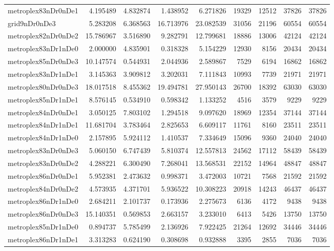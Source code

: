 \begin{longtable}{|l|r|r|r|r|r|r|r|r|}
metroplex83nDr0nDe1 & 4.195489 & 4.832874 & 1.438952 & 6.271826 & 19329 & 12512 & 37826 & 37826 \\
grid9nDr0nDe3 & 5.283208 & 6.368563 & 16.713976 & 23.082539 & 31056 & 21196 & 60554 & 60554 \\
metroplex82nDr0nDe2 & 15.786967 & 3.516890 & 9.282791 & 12.799681 & 18886 & 13006 & 42124 & 42124 \\
metroplex83nDr1nDe0 & 2.000000 & 4.835901 & 0.318328 & 5.154229 & 12930 & 8156 & 20434 & 20434 \\
metroplex85nDr0nDe3 & 10.147574 & 0.544931 & 2.044936 & 2.589867 & 7529 & 6194 & 16862 & 16862 \\
metroplex83nDr1nDe1 & 3.145363 & 3.909812 & 3.202031 & 7.111843 & 10993 & 7739 & 21971 & 21971 \\
metroplex80nDr0nDe3 & 18.017518 & 8.455362 & 19.494781 & 27.950143 & 26700 & 18392 & 63030 & 63030 \\
metroplex85nDr1nDe1 & 8.576145 & 0.534910 & 0.598342 & 1.133252 & 4516 & 3579 & 9229 & 9229 \\
metroplex84nDr0nDe1 & 3.050125 & 7.803102 & 1.294518 & 9.097620 & 18969 & 12354 & 37144 & 37144 \\
metroplex84nDr1nDe1 & 11.681704 & 3.783464 & 2.825653 & 6.609117 & 11761 & 8160 & 23511 & 23511 \\
metroplex84nDr1nDe0 & 2.157895 & 5.924112 & 1.410537 & 7.334649 & 15096 & 9360 & 24040 & 24040 \\
metroplex83nDr0nDe3 & 5.060150 & 6.747439 & 5.810374 & 12.557813 & 24562 & 17112 & 58439 & 58439 \\
metroplex83nDr0nDe2 & 4.288221 & 6.300490 & 7.268041 & 13.568531 & 22152 & 14964 & 48847 & 48847 \\
metroplex86nDr0nDe1 & 5.952381 & 2.473632 & 0.998371 & 3.472003 & 10721 & 7568 & 21592 & 21592 \\
metroplex84nDr0nDe2 & 4.573935 & 4.371701 & 5.936522 & 10.308223 & 20918 & 14243 & 46437 & 46437 \\
metroplex86nDr1nDe0 & 2.684211 & 2.101737 & 0.173936 & 2.275673 & 6136 & 4172 & 9438 & 9438 \\
metroplex86nDr0nDe3 & 15.140351 & 0.569853 & 2.663157 & 3.233010 & 6413 & 5426 & 13750 & 13750 \\
metroplex85nDr1nDe0 & 0.894737 & 5.785499 & 2.136926 & 7.922425 & 21264 & 12692 & 34446 & 34446 \\
metroplex86nDr1nDe1 & 3.313283 & 0.624190 & 0.308698 & 0.932888 & 3395 & 2855 & 7036 & 7036 \\

\end{longtable}
